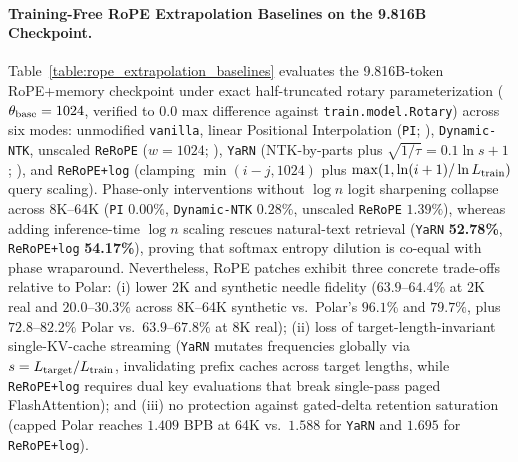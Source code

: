\begin{revblock}
\paragraph{Training-Free RoPE Extrapolation Baselines on the 9.816B Checkpoint.}
Table~\ref{table:rope_extrapolation_baselines} evaluates the 9.816B-token RoPE+memory checkpoint under exact half-truncated rotary parameterization ($\theta_{\rm base}=1024$, verified to $0.0$ max difference against \texttt{train.model.Rotary}) across six modes: unmodified \texttt{vanilla}, linear Positional Interpolation (\texttt{PI}; \citealp{chen2023extending}), \texttt{Dynamic-NTK}, unscaled \texttt{ReRoPE} ($w=1024$; \citealp{su2023rerope}), \texttt{YaRN} (NTK-by-parts plus $\sqrt{1/\tau}=0.1\ln s+1$; \citealp{peng2024yarn}), and \texttt{ReRoPE+log} (clamping $\min(i-j,1024)$ plus $\max(1,\ln(i+1)/\ln L_{\rm train})$ query scaling). Phase-only interventions without $\log n$ logit sharpening collapse across 8K--64K (\texttt{PI} $0.00\%$, \texttt{Dynamic-NTK} $0.28\%$, unscaled \texttt{ReRoPE} $1.39\%$), whereas adding inference-time $\log n$ scaling rescues natural-text retrieval (\texttt{YaRN} \textbf{52.78\%}, \texttt{ReRoPE+log} \textbf{54.17\%}), proving that softmax entropy dilution is co-equal with phase wraparound. Nevertheless, RoPE patches exhibit three concrete trade-offs relative to Polar: (i) lower 2K and synthetic needle fidelity ($63.9$--$64.4\%$ at 2K real and $20.0$--$30.3\%$ across 8K--64K synthetic vs.\ Polar's $96.1\%$ and $79.7\%$, plus $72.8$--$82.2\%$ Polar vs.\ $63.9$--$67.8\%$ at 8K real); (ii) loss of target-length-invariant single-KV-cache streaming (\texttt{YaRN} mutates frequencies globally via $s=L_{\rm target}/L_{\rm train}$, invalidating prefix caches across target lengths, while \texttt{ReRoPE+log} requires dual key evaluations that break single-pass paged FlashAttention); and (iii) no protection against gated-delta retention saturation (capped Polar reaches $1.409$ BPB at 64K vs.\ $1.588$ for \texttt{YaRN} and $1.695$ for \texttt{ReRoPE+log}).


\end{revblock}
